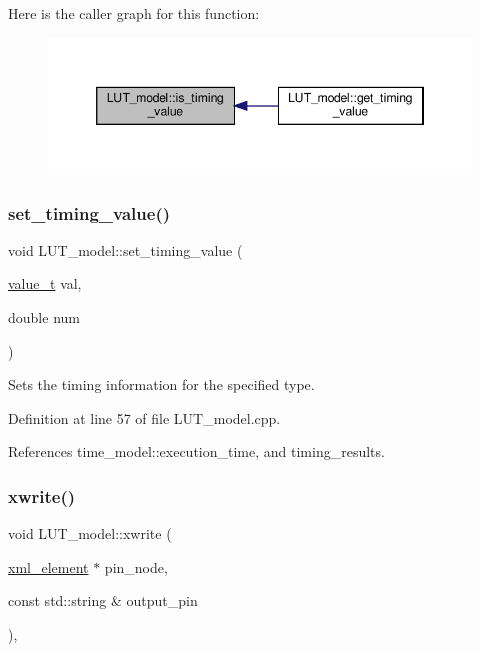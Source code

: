 Here is the caller graph for this function\+:
\nopagebreak
\begin{figure}[H]
\begin{center}
\leavevmode
\includegraphics[width=346pt]{dd/da2/classLUT__model_a9133ca4602d0a2470a5b47916e649d59_icgraph}
\end{center}
\end{figure}
\mbox{\label{classLUT__model_a13703801f1310ad9f4f41568877bb2ac}} 
\subsubsection{\texorpdfstring{set\+\_\+timing\+\_\+value()}{set\_timing\_value()}}
{\footnotesize\ttfamily void L\+U\+T\+\_\+model\+::set\+\_\+timing\+\_\+value (\begin{DoxyParamCaption}\item[{\hyperlink{classLUT__model_a863cc03b53b14df7344ada5a1bed2b20}{value\+\_\+t}}]{val,  }\item[{double}]{num }\end{DoxyParamCaption})}



Sets the timing information for the specified type. 



Definition at line 57 of file L\+U\+T\+\_\+model.\+cpp.



References time\+\_\+model\+::execution\+\_\+time, and timing\+\_\+results.

\mbox{\label{classLUT__model_a425bc1c19bd99c0b0817051ce78db81f}} 
\subsubsection{\texorpdfstring{xwrite()}{xwrite()}}
{\footnotesize\ttfamily void L\+U\+T\+\_\+model\+::xwrite (\begin{DoxyParamCaption}\item[{\hyperlink{classxml__element}{xml\+\_\+element} $\ast$}]{pin\+\_\+node,  }\item[{const std\+::string \&}]{output\+\_\+pin }\end{DoxyParamCaption})\hspace{0.3cm}{\ttfamily [override]}, {\ttfamily [virtual]}}



